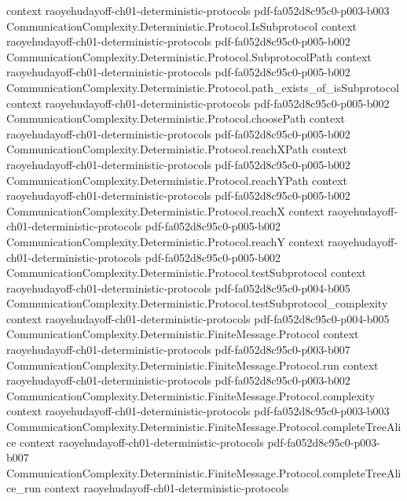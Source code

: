 \begin{theorem}
  {context}
  {raoyehudayoff-ch01-deterministic-protocols}
  {pdf-fa052d8c95c0-p003-b003}
\proofstep
  {CommunicationComplexity.Deterministic.Protocol.IsSubprotocol}
  {context}
  {raoyehudayoff-ch01-deterministic-protocols}
  {pdf-fa052d8c95c0-p005-b002}
\proofstep
  {CommunicationComplexity.Deterministic.Protocol.SubprotocolPath}
  {context}
  {raoyehudayoff-ch01-deterministic-protocols}
  {pdf-fa052d8c95c0-p005-b002}
\proofstep
  {CommunicationComplexity.Deterministic.Protocol.path_exists_of_isSubprotocol}
  {context}
  {raoyehudayoff-ch01-deterministic-protocols}
  {pdf-fa052d8c95c0-p005-b002}
\proofstep
  {CommunicationComplexity.Deterministic.Protocol.choosePath}
  {context}
  {raoyehudayoff-ch01-deterministic-protocols}
  {pdf-fa052d8c95c0-p005-b002}
\proofstep
  {CommunicationComplexity.Deterministic.Protocol.reachXPath}
  {context}
  {raoyehudayoff-ch01-deterministic-protocols}
  {pdf-fa052d8c95c0-p005-b002}
\proofstep
  {CommunicationComplexity.Deterministic.Protocol.reachYPath}
  {context}
  {raoyehudayoff-ch01-deterministic-protocols}
  {pdf-fa052d8c95c0-p005-b002}
\proofstep
  {CommunicationComplexity.Deterministic.Protocol.reachX}
  {context}
  {raoyehudayoff-ch01-deterministic-protocols}
  {pdf-fa052d8c95c0-p005-b002}
\proofstep
  {CommunicationComplexity.Deterministic.Protocol.reachY}
  {context}
  {raoyehudayoff-ch01-deterministic-protocols}
  {pdf-fa052d8c95c0-p005-b002}
\proofstep
  {CommunicationComplexity.Deterministic.Protocol.testSubprotocol}
  {context}
  {raoyehudayoff-ch01-deterministic-protocols}
  {pdf-fa052d8c95c0-p004-b005}
\proofstep
  {CommunicationComplexity.Deterministic.Protocol.testSubprotocol_complexity}
  {context}
  {raoyehudayoff-ch01-deterministic-protocols}
  {pdf-fa052d8c95c0-p004-b005}
\proofstep
  {CommunicationComplexity.Deterministic.FiniteMessage.Protocol}
  {context}
  {raoyehudayoff-ch01-deterministic-protocols}
  {pdf-fa052d8c95c0-p003-b007}
\proofstep
  {CommunicationComplexity.Deterministic.FiniteMessage.Protocol.run}
  {context}
  {raoyehudayoff-ch01-deterministic-protocols}
  {pdf-fa052d8c95c0-p003-b002}
\proofstep
  {CommunicationComplexity.Deterministic.FiniteMessage.Protocol.complexity}
  {context}
  {raoyehudayoff-ch01-deterministic-protocols}
  {pdf-fa052d8c95c0-p003-b003}
\proofstep
  {CommunicationComplexity.Deterministic.FiniteMessage.Protocol.completeTreeAlice}
  {context}
  {raoyehudayoff-ch01-deterministic-protocols}
  {pdf-fa052d8c95c0-p003-b007}
\proofstep
  {CommunicationComplexity.Deterministic.FiniteMessage.Protocol.completeTreeAlice_run}
  {context}
  {raoyehudayoff-ch01-deterministic-protocols}

\end{theorem}
